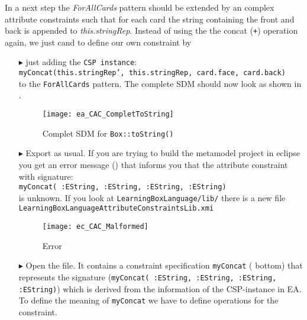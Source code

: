 In a next step the \emph{ForAllCards} pattern should be extended by an complex attribute constraints such that for each card the string containing the front and back is appended to \emph{this.stringRep}.  	 
Instead of using the the concat (\texttt{+}) operation again, we just cand to define our own constraint by
\begin{itemize}
\item[$\blacktriangleright$] just adding the \texttt{CSP instance}: \\
\hspace*{0.5cm}\texttt{\small myConcat(this.stringRep', this.stringRep, card.face, card.back)}\\
to the \texttt{ForAllCards} pattern. The complete SDM should now look as shown in .

\begin{figure}[htbp]
\begin{center}
  \texttt{[image: ea\_CAC\_CompletToString]}
  \caption{Complet SDM for \texttt{Box::toString()}}  
  \label{ea_CAC_CompletToString}
\end{center}
\end{figure}
\item[$\blacktriangleright$] Export as usual. If you are trying to build the metamodel project in eclipse you get an error message () that informs you that the attribute constraint with signature: \\
\hspace*{0.5cm} \texttt{\small myConcat( :EString, :EString, :EString, :EString)} \\
is unknown. If you look at \texttt{LearningBoxLanguage/lib/} there is a new file  \texttt{LearningBoxLanguageAttributeConstraintsLib.xmi} 
 
\begin{figure}[htbp]
\begin{center}
  \texttt{[image: ec\_CAC\_Malformed]}
  \caption{Error}  
  \label{ec_CAC_Malformed}
\end{center}
\end{figure}



\item[$\blacktriangleright$] Open the file. It contains a constraint specification \texttt{myConcat} ( bottom) that represents the signature (\texttt{\small myConcat( :EString, :EString, :EString, :EString)}) which is derived from the information of the CSP-instance in EA. To define the meaning of \texttt{myConcat} we have to define operations for the constraint.


\end{itemize}
